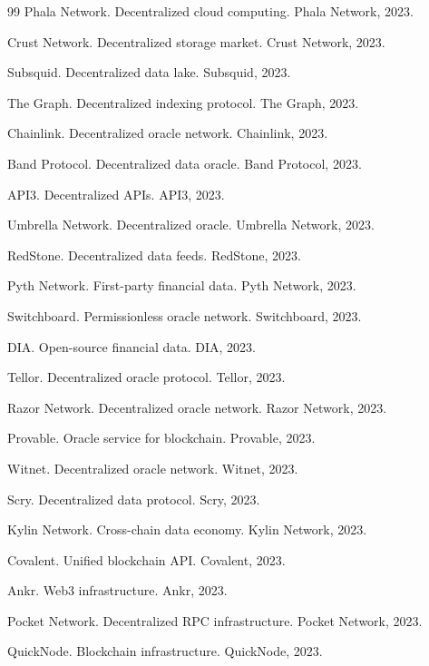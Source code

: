 \documentclass[12pt,a4paper]{ctexart}
\begin{document}
\begin{thebibliography}{99}
 Phala Network. Decentralized cloud computing. Phala Network, 2023.

 Crust Network. Decentralized storage market. Crust Network, 2023.

 Subsquid. Decentralized data lake. Subsquid, 2023.

 The Graph. Decentralized indexing protocol. The Graph, 2023.

 Chainlink. Decentralized oracle network. Chainlink, 2023.

 Band Protocol. Decentralized data oracle. Band Protocol, 2023.

 API3. Decentralized APIs. API3, 2023.

 Umbrella Network. Decentralized oracle. Umbrella Network, 2023.

 RedStone. Decentralized data feeds. RedStone, 2023.

 Pyth Network. First-party financial data. Pyth Network, 2023.

 Switchboard. Permissionless oracle network. Switchboard, 2023.

 DIA. Open-source financial data. DIA, 2023.

 Tellor. Decentralized oracle protocol. Tellor, 2023.

 Razor Network. Decentralized oracle network. Razor Network, 2023.

 Provable. Oracle service for blockchain. Provable, 2023.

 Witnet. Decentralized oracle network. Witnet, 2023.

 Scry. Decentralized data protocol. Scry, 2023.

 Kylin Network. Cross-chain data economy. Kylin Network, 2023.

 Covalent. Unified blockchain API. Covalent, 2023.

 Ankr. Web3 infrastructure. Ankr, 2023.

 Pocket Network. Decentralized RPC infrastructure. Pocket Network, 2023.

 QuickNode. Blockchain infrastructure. QuickNode, 2023.


\end{thebibliography}
\end{document}
